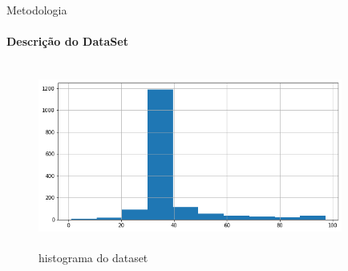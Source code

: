 \documentclass[]{beamer}
\begin{document}
	\begin{frame}{Metodologia}
		\framesubtitle{Descrição do DataSet}
		\begin{figure}[!htb]	
			\begin{center}
				\includegraphics[width=10cm,height=6cm]{../imagens/sensores/hist.png}
			\end{center}
			\caption{histograma do dataset}
			\label{figura:bruto}
		\end{figure}	
	\end{frame}
\end{document}
